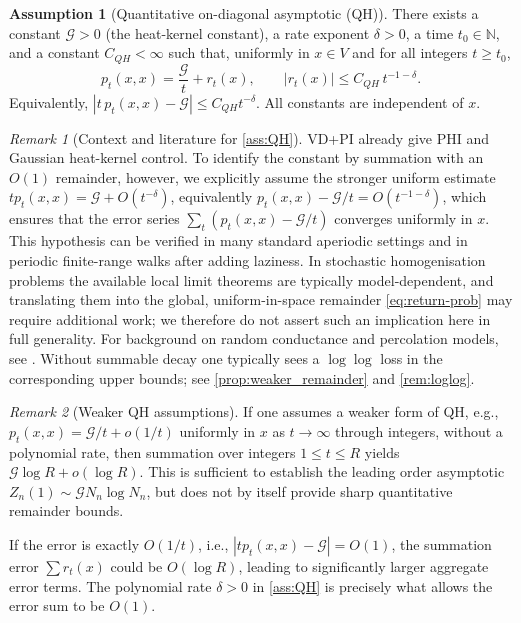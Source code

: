 \documentclass[reqno]{amsart}
\numberwithin{equation}{section}
\theoremstyle{definition}
\newtheorem{assumption}[assumption]{Assumption}
\theoremstyle{remark}
\newtheorem{remark}[remark]{Remark}
\newcommand{\Cref}[1]{\autoref{#1}}
\newcommand{\cG}{\mathcal{G}}
\newcommand{\N}{\mathbb{N}}
\begin{document}
\begin{assumption}[Quantitative on-diagonal asymptotic (QH)]\label{ass:QH}
There exists a constant $\cG > 0$ (the heat-kernel constant), a rate exponent $\delta>0$, a time $t_0\in\N$, and a constant $C_{QH}<\infty$ such that, uniformly in $x\in V$ and for all integers $t\ge t_0$,
\begin{equation}\label{eq:return-prob}
  p_t(x,x) = \frac{\cG}{t} + r_t(x),\qquad |r_t(x)| \le C_{QH}\, t^{-1-\delta}.
\end{equation}
Equivalently, $|t\,p_t(x,x)-\cG|\le C_{QH} t^{-\delta}$. All constants are independent of $x$.
\end{assumption}


\begin{remark}[Context and literature for \Cref{ass:QH}]\label{rem:QH_validity}
VD+PI already give PHI and Gaussian heat-kernel control. To identify the constant by summation with an $O(1)$ remainder, however, we explicitly assume the stronger uniform estimate $t p_t(x,x)=\cG+O(t^{-\delta})$, equivalently $p_t(x,x)-\cG/t=O(t^{-1-\delta})$, which ensures that the error series $\sum_t (p_t(x,x)-\cG/t)$ converges uniformly in $x$. This hypothesis can be verified in many standard aperiodic settings and in periodic finite-range walks after adding laziness. In stochastic homogenisation problems the available local limit theorems are typically model-dependent, and translating them into the global, uniform-in-space remainder \eqref{eq:return-prob} may require additional work; we therefore do not assert such an implication here in full generality. For background on random conductance and percolation models, see \cite{Biskup11,AndresDeuschelSlowik19,Barlow04,ArmstrongDario18,GloriaOtto17,CroydonHambly21}. Without summable decay one typically sees a $\log\log$ loss in the corresponding upper bounds; see \Cref{prop:weaker_remainder} and \Cref{rem:loglog}.
\end{remark}


\begin{remark}[Weaker QH assumptions]\label{rem:weaker_QH}
If one assumes a weaker form of QH, e.g., $p_t(x,x) = \cG/t + o(1/t)$ uniformly in $x$ as $t\to\infty$ through integers, without a polynomial rate, then summation over integers $1\le t\le R$ yields $\cG \log R + o(\log R)$. This is sufficient to establish the leading order asymptotic $Z_n(1) \sim \cG N_n \log N_n$, but does not by itself provide sharp quantitative remainder bounds.

If the error is exactly $O(1/t)$, i.e., $|t p_t(x,x) - \cG| = O(1)$, the summation error $\sum r_t(x)$ could be $O(\log R)$, leading to significantly larger aggregate error terms. The polynomial rate $\delta>0$ in \Cref{ass:QH} is precisely what allows the error sum to be $O(1)$.
\end{remark}
\end{document}
